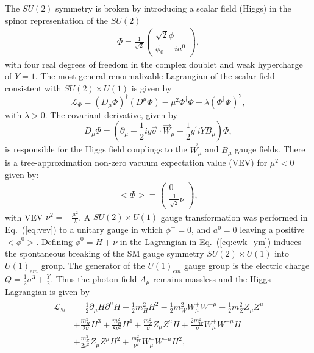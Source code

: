 The $SU(2)$ symmetry is broken by introducing a scalar field (Higgs) in the spinor representation of the $SU(2)$ 
\begin{eqnarray} \label{eq:lang_higgs}
\Phi  = \frac{1}{\sqrt{2}}\left(\begin{array}{c} \sqrt{2}\phi^{+}\\ \phi_{0}+ia^{0} \end{array} \right),
\end{eqnarray}   
with four real degrees of freedom in the complex doublet and weak hypercharge of $Y=1$. The most general renormalizable Lagrangian of the scalar field consistent with $SU(2) \times U(1)$ is given by
\begin{equation} \label{eq:ewk_higgs}
\mathcal{L}_{\Phi} = (D_{\mu}\Phi)^{\dagger} (D^{\mu}\Phi) - \mu^2 \Phi^{\dagger}\Phi - \lambda (\Phi^{\dagger}\Phi)^2,
\end{equation}
with $\lambda>0$. The covariant derivative, given by
\begin{equation} \label{eq:higgs_cov}
D_{\mu}\Phi = (\partial_{\mu}+\frac{1}{2}ig\vec{\sigma}\cdot\vec{W}_{\mu}+\frac{1}{2}g^{'}iYB_{\mu})\Phi,
\end{equation}
is responsible for the Higgs field couplings to the $\vec{W}_{\mu}$ and $B_{\mu}$ gauge fields. There is a tree-approximation non-zero vacuum expectation value (VEV) for $\mu^2<0$ given by:
\begin{eqnarray} \label{eq:vev}
<\Phi>  =  \left(\begin{array}{c} 0\\ \frac{1}{\sqrt{2}}\nu \end{array} \right),
\end{eqnarray}    
with VEV $\nu^2= -\frac{\mu^2}{\lambda}$. A $SU(2)\times U(1)$ gauge transformation was performed in Eq.~(\ref{eq:vev}) to a unitary gauge in which $\phi^{+}=0$, and $a^{0}=0$ leaving a positive $<\phi^{0}>$. Defining $\phi^{0}=H+\nu$ in the Lagrangian in Eq.~(\ref{eq:ewk_ym}) induces the spontaneous breaking of the SM gauge symmetry $SU(2)\times U(1)$ into $U(1)_{em}$ group. The generator of the $U(1)_{em}$ gauge group is the electric charge $Q=\frac{1}{2}\sigma^3+\frac{Y}{2}$. Thus the photon field $A_{\mu}$ remains massless and the Higgs Lagrangian is given by
 \begin{eqnarray} \label{eq:ewk_higgs2}
 \begin{aligned}
\mathcal{L_{H}} &= \frac{1}{2} \partial_{\mu}H\partial^{\mu}H - \frac{1}{2} m_{H}^2 H^2 -\frac{1}{2}m_{W}^2W_{\mu}^{+}W^{-\mu} - \frac{1}{2}m_{Z}^2Z_{\mu}Z^{\mu}  \\
&+ \frac{m_{H}^2}{2\nu} H^3 + \frac{m_{H}^2}{8\nu^2} H^4 + \frac{m_{Z}^2}{\nu} Z_{\mu}Z^{\mu}H + \frac{2m_{W}^2}{\nu} W^{+}_{\mu}W^{-\mu} H  \\
&+ \frac{m_{Z}^2}{2\nu^2} Z_{\mu}Z^{\mu} H^2 +\frac{m_{W}^2}{\nu^2} W^{+}_{\mu}W^{-\mu} H^2,
\end{aligned}
\end{eqnarray}
